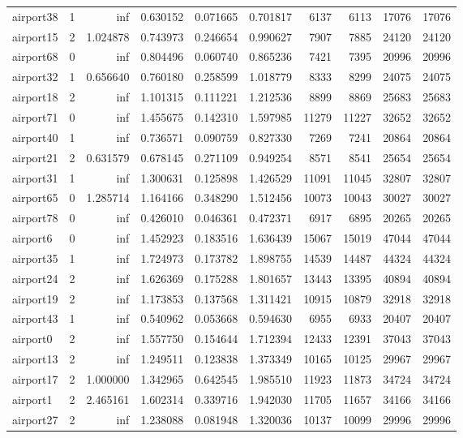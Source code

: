 \begin{longtable}{|l|r|r|r|r|r|r|r|r|r|}
airport38 & 1 & inf & 0.630152 & 0.071665 & 0.701817 & 6137 & 6113 & 17076 & 17076 \\
airport15 & 2 & 1.024878 & 0.743973 & 0.246654 & 0.990627 & 7907 & 7885 & 24120 & 24120 \\
airport68 & 0 & inf & 0.804496 & 0.060740 & 0.865236 & 7421 & 7395 & 20996 & 20996 \\
airport32 & 1 & 0.656640 & 0.760180 & 0.258599 & 1.018779 & 8333 & 8299 & 24075 & 24075 \\
airport18 & 2 & inf & 1.101315 & 0.111221 & 1.212536 & 8899 & 8869 & 25683 & 25683 \\
airport71 & 0 & inf & 1.455675 & 0.142310 & 1.597985 & 11279 & 11227 & 32652 & 32652 \\
airport40 & 1 & inf & 0.736571 & 0.090759 & 0.827330 & 7269 & 7241 & 20864 & 20864 \\
airport21 & 2 & 0.631579 & 0.678145 & 0.271109 & 0.949254 & 8571 & 8541 & 25654 & 25654 \\
airport31 & 1 & inf & 1.300631 & 0.125898 & 1.426529 & 11091 & 11045 & 32807 & 32807 \\
airport65 & 0 & 1.285714 & 1.164166 & 0.348290 & 1.512456 & 10073 & 10043 & 30027 & 30027 \\
airport78 & 0 & inf & 0.426010 & 0.046361 & 0.472371 & 6917 & 6895 & 20265 & 20265 \\
airport6 & 0 & inf & 1.452923 & 0.183516 & 1.636439 & 15067 & 15019 & 47044 & 47044 \\
airport35 & 1 & inf & 1.724973 & 0.173782 & 1.898755 & 14539 & 14487 & 44324 & 44324 \\
airport24 & 2 & inf & 1.626369 & 0.175288 & 1.801657 & 13443 & 13395 & 40894 & 40894 \\
airport19 & 2 & inf & 1.173853 & 0.137568 & 1.311421 & 10915 & 10879 & 32918 & 32918 \\
airport43 & 1 & inf & 0.540962 & 0.053668 & 0.594630 & 6955 & 6933 & 20407 & 20407 \\
airport0 & 2 & inf & 1.557750 & 0.154644 & 1.712394 & 12433 & 12391 & 37043 & 37043 \\
airport13 & 2 & inf & 1.249511 & 0.123838 & 1.373349 & 10165 & 10125 & 29967 & 29967 \\
airport17 & 2 & 1.000000 & 1.342965 & 0.642545 & 1.985510 & 11923 & 11873 & 34724 & 34724 \\
airport1 & 2 & 2.465161 & 1.602314 & 0.339716 & 1.942030 & 11705 & 11657 & 34166 & 34166 \\
airport27 & 2 & inf & 1.238088 & 0.081948 & 1.320036 & 10137 & 10099 & 29996 & 29996 \\

\end{longtable}
